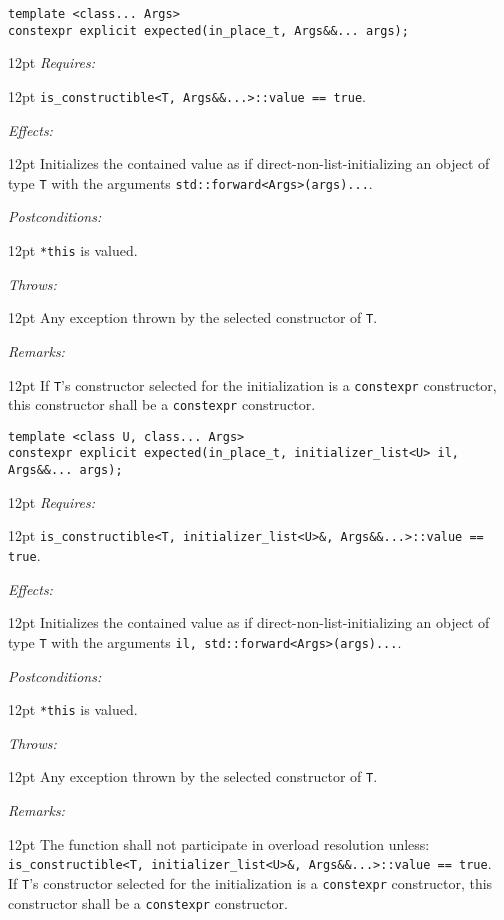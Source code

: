 \documentclass[a4paper,10pt]{article}
\newcommand{\cpp}[1]{\lstinline{#1}}
\newcommand{\wordingItem}[1]{\noindent\textit{#1:}}
\newenvironment{wordingTextItem}[1]{\wordingItem{#1}\vspace{7pt}\noindent\begin{adjustwidth}{12pt}{}}{\vspace{7pt}\end{adjustwidth}}
\newenvironment{wordingPara}{\begin{adjustwidth}{12pt}{}}{\end{adjustwidth}}
\begin{document}
\begin{lstlisting}[xleftmargin=0pt]
template <class... Args>
constexpr explicit expected(in_place_t, Args&&... args); 
\end{lstlisting}
\begin{wordingPara}
\begin{wordingTextItem}{Requires}
\cpp{is_constructible<T, Args&&...>::value == true}.
\end{wordingTextItem}
\begin{wordingTextItem}{Effects}
Initializes the contained value as if direct-non-list-initializing an object of type \cpp{T} with the arguments \cpp{std::forward<Args>(args)...}.
\end{wordingTextItem}
\begin{wordingTextItem}{Postconditions}
\cpp{*this} is valued.
\end{wordingTextItem}
\begin{wordingTextItem}{Throws}
Any exception thrown by the selected constructor of \cpp{T}.
\end{wordingTextItem}
\begin{wordingTextItem}{Remarks}
If \cpp{T}'s constructor selected for the initialization is a \cpp{constexpr} constructor, this constructor shall be a \cpp{constexpr} constructor.
\end{wordingTextItem}
\end{wordingPara}

\begin{lstlisting}[xleftmargin=0pt]
template <class U, class... Args>
constexpr explicit expected(in_place_t, initializer_list<U> il, Args&&... args); 
\end{lstlisting}
\begin{wordingPara}
\begin{wordingTextItem}{Requires}
\cpp{is_constructible<T, initializer_list<U>&, Args&&...>::value == true}.
\end{wordingTextItem}
\begin{wordingTextItem}{Effects}
Initializes the contained value as if direct-non-list-initializing an object of type \cpp{T} with the arguments \cpp{il, std::forward<Args>(args)...}.
\end{wordingTextItem}
\begin{wordingTextItem}{Postconditions}
\cpp{*this} is valued.
\end{wordingTextItem}
\begin{wordingTextItem}{Throws}
Any exception thrown by the selected constructor of \cpp{T}.
\end{wordingTextItem}
\begin{wordingTextItem}{Remarks}
The function shall not participate in overload resolution unless:\\
\noindent
\cpp{is_constructible<T, initializer_list<U>&, Args&&...>::value == true}.\\

\noindent
If \cpp{T}'s constructor selected for the initialization is a \cpp{constexpr} constructor, this constructor shall be a \cpp{constexpr} constructor.
\end{wordingTextItem}
\end{wordingPara}
\end{document}
